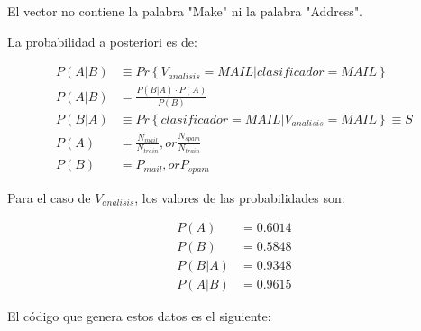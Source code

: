 \documentclass[11pt]{article} %
\begin{document}
El vector no contiene la palabra "Make" ni la palabra "Address".

\newpage

La probabilidad a posteriori es de:

\begin{equation}
	\begin{aligned}
		P\left(A | B\right) &\equiv Pr \left\lbrace V_{analisis}=MAIL | clasificador=MAIL \right\rbrace \\
		P\left(A | B\right) &= \frac{P \left( B | A \right) \cdot P \left( A \right)}{P \left( B \right)} \\
		P \left( B | A \right) & \equiv Pr \left\lbrace clasificador=MAIL | V_{analisis}=MAIL \right\rbrace \equiv S\\
		P \left( A \right) &= \frac{N_{mail}}{N_{train}}, or \frac{N_{spam}}{N_{train}} \\
		P \left( B \right) &= P_{mail} , or P_{spam}
	\end{aligned}
\end{equation}

Para el caso de $V_{analisis}$, los valores de las probabilidades son:

\begin{align}
	P \left( A \right) &= 0.6014 \\
	P \left( B \right) &= 0.5848 \\
	P \left( B | A \right) &= 0.9348 \\
	P\left(A | B\right) &= 0.9615
\end{align}

El código que genera estos datos es el siguiente:


\end{document}
